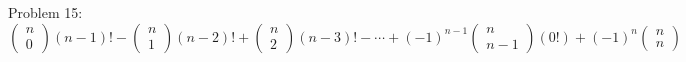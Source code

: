 \documentclass{article}
\begin{document}
Problem 15:
$$
\left(\begin{array}{c}
n\\
0
\end{array}\right)
(n-1)!
-
\left(\begin{array}{c}
n\\
1
\end{array}\right)
(n-2)!
+
\left(\begin{array}{c}
n\\
2
\end{array}\right)
(n-3)!
-
\cdots
+
(-1)^{n-1}
\left(\begin{array}{c}
n\\
n-1
\end{array}\right)
(0!)
+
(-1)^{n}
\left(\begin{array}{c}
n\\
n
\end{array}\right)
$$
\end{document}
